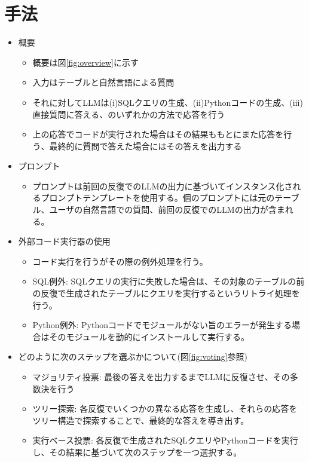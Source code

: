 \documentclass[dvipdfmx,uplatex]{jsarticle}
\theoremstyle{remark}
\newenvironment{method}[1]{
    \begin{tcolorbox}[
        colframe=green!50!black,
        colback=green!50!black!10!white,
        colbacktitle=green!50!black!40!white,
        coltitle=black,
        fonttitle=\bfseries,
        title={#1}
    ]
}{
    \end{tcolorbox}
}
\begin{document}
\section{手法}
\begin{method}{ReAcTable}
\begin{itemize}
    \item 概要
    \begin{itemize}
        \item 概要は図\ref{fig:overview}に示す
        \item 入力はテーブルと自然言語による質問
        \item それに対してLLMは(i)SQLクエリの生成、(ii)Pythonコードの生成、(iii)直接質問に答える、のいずれかの方法で応答を行う
        \item 上の応答でコードが実行された場合はその結果ももとにまた応答を行う、最終的に質問で答えた場合にはその答えを出力する
    \end{itemize}
    \item プロンプト
    \begin{itemize}
        \item プロンプトは前回の反復でのLLMの出力に基づいてインスタンス化されるプロンプトテンプレートを使用する。個のプロンプトには元のテーブル、ユーザの自然言語での質問、前回の反復でのLLMの出力が含まれる。
    \end{itemize}
    \item 外部コード実行器の使用
    \begin{itemize}
        \item コード実行を行うがその際の例外処理を行う。
        \item SQL例外: SQLクエリの実行に失敗した場合は、その対象のテーブルの前の反復で生成されたテーブルにクエリを実行するというリトライ処理を行う。
        \item Python例外: Pythonコードでモジュールがない旨のエラーが発生する場合はそのモジュールを動的にインストールして実行する。 
    \end{itemize}
    \item どのように次のステップを選ぶかについて(図\ref{fig:voting}参照)
    \begin{itemize}
        \item マジョリティ投票: 最後の答えを出力するまでLLMに反復させ、その多数決を行う
        \item ツリー探索: 各反復でいくつかの異なる応答を生成し、それらの応答をツリー構造で探索することで、最終的な答えを導き出す。
        \item 実行ベース投票: 各反復で生成されたSQLクエリやPythonコードを実行し、その結果に基づいて次のステップを一つ選択する。
    \end{itemize}
\end{itemize}
\end{method}
\end{document}

